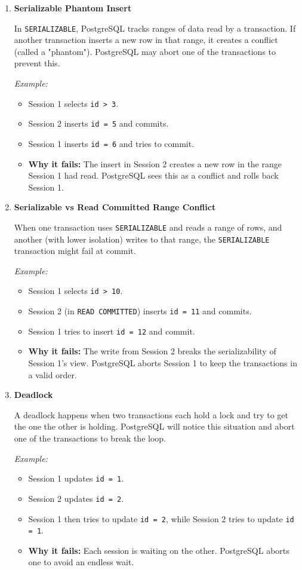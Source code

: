 \documentclass{article}
\begin{document}
\begin{enumerate}[label=\alph*)]
\begin{enumerate}
    \item \textbf{Serializable Phantom Insert}

    In \texttt{SERIALIZABLE}, PostgreSQL tracks ranges of data read by a transaction. If another transaction inserts a new row in that range, it creates a conflict (called a "phantom"). PostgreSQL may abort one of the transactions to prevent this.

    \textit{Example:}
    \begin{itemize}
        \item Session 1 selects \texttt{id > 3}.
        \item Session 2 inserts \texttt{id = 5} and commits.
        \item Session 1 inserts \texttt{id = 6} and tries to commit.
        \item \textbf{Why it fails:} The insert in Session 2 creates a new row in the range Session 1 had read. PostgreSQL sees this as a conflict and rolls back Session 1.
    \end{itemize}

    \item \textbf{Serializable vs Read Committed Range Conflict}

When one transaction uses \texttt{SERIALIZABLE} and reads a range of rows, 
and another (with lower isolation) writes to that range, the 
\texttt{SERIALIZABLE} transaction might fail at commit.

    \textit{Example:}
    \begin{itemize}
        \item Session 1 selects \texttt{id > 10}.
        \item Session 2 (in \texttt{READ COMMITTED}) inserts \texttt{id = 11} and commits.
        \item Session 1 tries to insert \texttt{id = 12} and commit.
        \item \textbf{Why it fails:} The write from Session 2 breaks the serializability of Session 1's view. PostgreSQL aborts Session 1 to keep the transactions in a valid order.
    \end{itemize}

    \item \textbf{Deadlock}

    A deadlock happens when two transactions each hold a lock and try to get the one the other is holding. PostgreSQL will notice this situation and abort one of the transactions to break the loop.

    \textit{Example:}
    \begin{itemize}
        \item Session 1 updates \texttt{id = 1}.
        \item Session 2 updates \texttt{id = 2}.
        \item Session 1 then tries to update \texttt{id = 2}, while Session 2 tries to update \texttt{id = 1}.
        \item \textbf{Why it fails:} Each session is waiting on the other. PostgreSQL aborts one to avoid an endless wait.
    \end{itemize}


\end{enumerate}
\end{enumerate}
\end{document}
